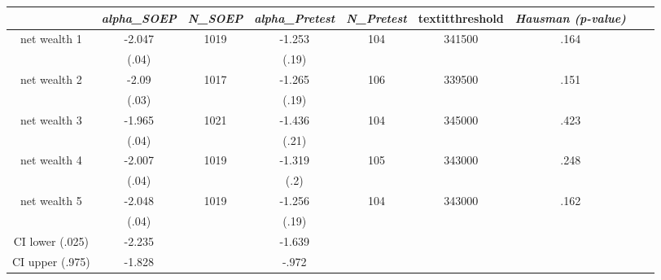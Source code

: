 \begin{tabular}{ccccccccc}
\hline \textit{}&   \textit{alpha\_SOEP}&   \textit{N\_SOEP}&       \textit{alpha\_Pretest}&        \textit{N\_Pretest}&    textit{threshold}&      \textit{Hausman (p-value)}\\ \hline
net wealth 1&-2.047&1019&-1.253&104&341500&.164\\
&(.04)&&(.19)&&&\\
net wealth 2&-2.09&1017&-1.265&106&339500&.151\\
&(.03)&&(.19)&&&\\
net wealth 3&-1.965&1021&-1.436&104&345000&.423\\
&(.04)&&(.21)&&&\\
net wealth 4&-2.007&1019&-1.319&105&343000&.248\\
&(.04)&&(.2)&&&\\
net wealth 5&-2.048&1019&-1.256&104&343000&.162\\
&(.04)&&(.19)&&&\\
CI lower (.025)&-2.235&&-1.639&&&\\
CI upper (.975)&-1.828&&-.972&&&\\
\hline \end{tabular}
